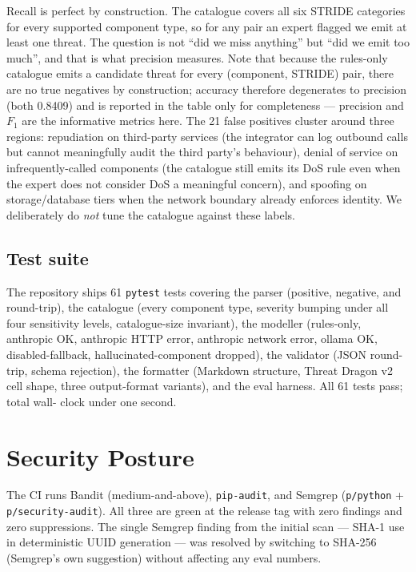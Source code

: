 \documentclass[conference]{IEEEtran}
\begin{document}
Recall is perfect by construction. The catalogue covers all six
STRIDE categories for every supported component type, so for any
pair an expert flagged we emit at least one threat. The
question is not ``did we miss anything'' but ``did we emit too
much'', and that is what precision measures. Note that because the
rules-only catalogue emits a candidate threat for every
(component, STRIDE) pair, there are no true negatives by
construction; accuracy therefore degenerates to precision (both
0.8409) and is reported in the table only for completeness ---
precision and $F_1$ are the informative metrics here. The 21 false positives
cluster around three regions: repudiation on third-party services
(the integrator can log outbound calls but cannot meaningfully audit
the third party's behaviour), denial of service on
infrequently-called components (the catalogue still emits its
DoS rule even when the expert does not consider DoS a meaningful
concern), and spoofing on storage/database tiers when the network
boundary already enforces identity. We deliberately do \emph{not}
tune the catalogue against these labels.

\subsection{Test suite}
The repository ships 61 \texttt{pytest} tests covering the parser
(positive, negative, and round-trip), the catalogue (every
component type, severity bumping under all four sensitivity levels,
catalogue-size invariant), the modeller (rules-only, anthropic OK,
anthropic HTTP error, anthropic network error, ollama OK,
disabled-fallback, hallucinated-component dropped), the validator
(JSON round-trip, schema rejection), the formatter (Markdown
structure, Threat Dragon v2 cell shape, three output-format
variants), and the eval harness. All 61 tests pass; total wall-
clock under one second.

\section{Security Posture}
The CI runs Bandit (medium-and-above), \texttt{pip-audit}, and
Semgrep (\texttt{p/python} + \texttt{p/security-audit}). All three
are green at the release tag with zero findings and zero
suppressions. The single Semgrep finding from the initial scan ---
SHA-1 use in deterministic UUID generation --- was resolved by
switching to SHA-256 (Semgrep's own suggestion) without affecting
any eval numbers.
\end{document}
